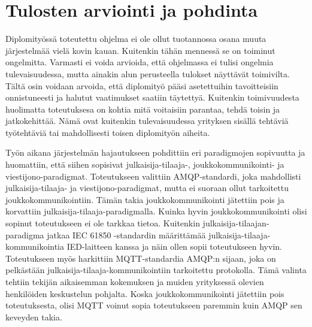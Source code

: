 \chapter{Tulosten arviointi ja pohdinta}
\label{ch:arviointi}
Diplomityössä toteutettu ohjelma ei ole ollut tuotannossa osana muuta järjestelmää vielä kovin kauan. Kuitenkin tähän mennessä se on toiminut ongelmitta. Varmasti ei voida arvioida, että ohjelmassa ei tulisi ongelmia tulevaisuudessa, mutta ainakin alun perusteella tulokset näyttävät toimivilta. Tältä osin voidaan arvoida, että diplomityö pääsi asetettuihin tavoitteisiin onnistuneesti ja halutut vaatimukset saatiin täytettyä. Kuitenkin toimivuudesta huolimatta toteutuksesa on kohtia mitä voitaisiin parantaa, tehdä toisin ja jatkokehittää. Nämä ovat kuitenkin tulevaisuudessa yrityksen sisällä tehtäviä työtehtäviä tai mahdollisesti toisen diplomityön aiheita.

Työn aikana järjestelmän hajautukseen pohdittiin eri paradigmojen sopivuutta ja huomattiin, että siihen sopisivat julkaisija-tilaaja-, joukkokommunikointi- ja viestijono-pa\-ra\-dig\-mat. Toteutukseen valittiin AMQP-standardi, joka mahdollisti julkaisija-tilaaja- ja viestijono-pa\-ra\-dig\-mat, mutta ei suoraan ollut tarkoitettu joukkokommunikointiin. Tämän takia joukkokommunikointi jätettiin pois ja korvattiin julkaisija-tilaaja-paradigmalla. Kuinka hyvin joukkokommunikointi olisi sopinut toteutukseen ei ole tarkkaa tietoa. Kuitenkin julkaisija-tilaajan-paradigma jatkaa IEC 61850 -standardin määrittämää julkaisija-tilaaja-kom\-mu\-ni\-koin\-ti\-a IED-laitteen kanssa ja näin ollen sopii toteutukseen hyvin. Toteutukseen myös harkittiin MQTT-standardia AMQP:n sijaan, joka on pelkästään julkaisija-tilaaja-kom\-mu\-ni\-koin\-tiin tarkoitettu protokolla. Tämä valinta tehtiin tekijän aikaisemman kokemuksen ja muiden yrityksessä olevien henkilöiden keskustelun pohjalta. Koska joukkokommunikointi jätettiin pois toteutuksesta, olisi MQTT voinut sopia toteutukseen paremmin kuin AMQP sen keveyden takia.

